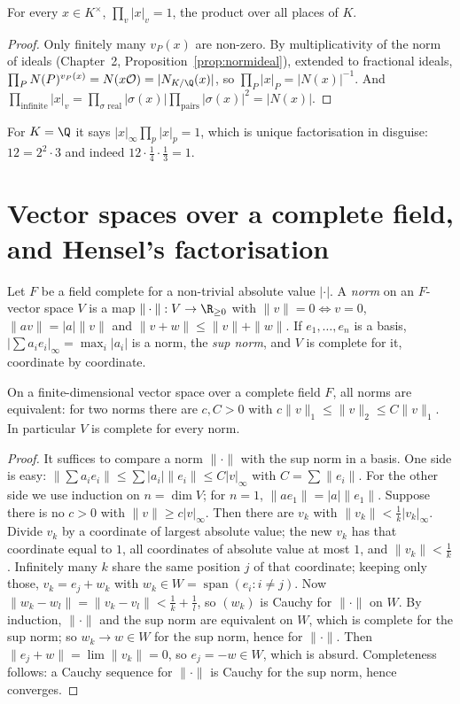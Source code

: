 \begin{proposition}\label{prop:productformula}
For every $x\in K^\times$, $\displaystyle\prod_v|x|_v=1$, the product over all places of $K$.
\end{proposition}
\begin{proof}
Only finitely many $v_P(x)$ are non-zero. By multiplicativity of the norm of ideals (Chapter~2, Proposition~\ref{prop:normideal}),
extended to fractional ideals, $\prod_PN(P)^{v_P(x)}=N(x\mathcal O)=|N_{K/\Q}(x)|$, so $\prod_P|x|_P=|N(x)|^{-1}$. And
$\prod_{\text{infinite}}|x|_v=\prod_{\sigma\text{ real}}|\sigma(x)|\prod_{\text{pairs}}|\sigma(x)|^2=|N(x)|$.
\end{proof}

For $K=\Q$ it says $|x|_\infty\prod_p|x|_p=1$, which is unique factorisation in disguise: $12=2^2\cdot3$ and indeed
$12\cdot\frac14\cdot\frac13=1$.

\section{Vector spaces over a complete field, and Hensel's factorisation}

Let $F$ be a field complete for a non-trivial absolute value $|\cdot|$. A \emph{norm} on an $F$-vector space $V$ is a map
$\|\cdot\|:V\to\R_{\ge0}$ with $\|v\|=0\iff v=0$, $\|av\|=|a|\|v\|$ and $\|v+w\|\le\|v\|+\|w\|$. If $e_1,\dots,e_n$ is a basis,
$|\sum a_ie_i|_\infty=\max_i|a_i|$ is a norm, the \emph{sup norm}, and $V$ is complete for it, coordinate by coordinate.

\begin{theorem}\label{thm:normequiv}
On a finite-dimensional vector space over a complete field $F$, all norms are equivalent: for two norms there are $c,C>0$
with $c\|v\|_1\le\|v\|_2\le C\|v\|_1$. In particular $V$ is complete for every norm.
\end{theorem}
\begin{proof}
It suffices to compare a norm $\|\cdot\|$ with the sup norm in a basis. One side is easy: $\|\sum a_ie_i\|\le\sum|a_i|\|e_i\|
\le C|v|_\infty$ with $C=\sum\|e_i\|$. For the other side we use induction on $n=\dim V$; for $n=1$, $\|ae_1\|=|a|\|e_1\|$.
Suppose there is no $c>0$ with $\|v\|\ge c|v|_\infty$. Then there are $v_k$ with $\|v_k\|<\frac1k|v_k|_\infty$. Divide $v_k$ by
a coordinate of largest absolute value; the new $v_k$ has that coordinate equal to $1$, all coordinates of absolute value at
most $1$, and $\|v_k\|<\frac1k$. Infinitely many $k$ share the same position $j$ of that coordinate; keeping only those,
$v_k=e_j+w_k$ with $w_k\in W=\operatorname{span}(e_i:i\ne j)$. Now $\|w_k-w_l\|=\|v_k-v_l\|<\frac1k+\frac1l$, so $(w_k)$ is Cauchy for
$\|\cdot\|$ on $W$. By induction, $\|\cdot\|$ and the sup norm are equivalent on $W$, which is complete for the sup norm; so
$w_k\to w\in W$ for the sup norm, hence for $\|\cdot\|$. Then $\|e_j+w\|=\lim\|v_k\|=0$, so $e_j=-w\in W$, which is absurd.
Completeness follows: a Cauchy sequence for $\|\cdot\|$ is Cauchy for the sup norm, hence converges.
\end{proof}

